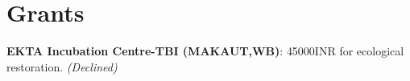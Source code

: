 \documentclass[a4paper,11pt]{article}
\begin{document}
\section{Grants}
\begin{itemize}[leftmargin=0.15in, label={}]
    \normalsize{\item{
     \textbf{EKTA Incubation Centre-TBI (MAKAUT,WB)}{: {45000INR for ecological restoration. \textit{(Declined)}} } \\
    }}    
 \end{itemize}
\end{document}
